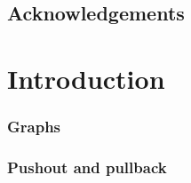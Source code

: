 \documentclass{book}
\begin{document}
  
  
  

\section*{Acknowledgements}

\newpage      


\tableofcontents  
\newpage      
 
\chapter{Introduction}
\subsection{Graphs}
 
\subsection{Pushout and pullback}  





\end{document}
